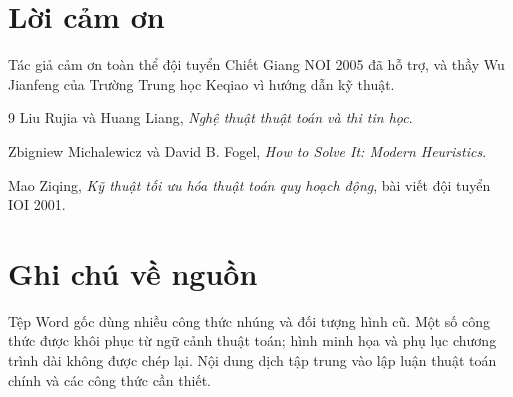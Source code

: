 \documentclass[11pt]{article}
\begin{document}
\section*{Lời cảm ơn}

Tác giả cảm ơn toàn thể đội tuyển Chiết Giang NOI 2005 đã hỗ trợ, và thầy Wu
Jianfeng của Trường Trung học Keqiao vì hướng dẫn kỹ thuật.

\begin{thebibliography}{9}
Liu Rujia và Huang Liang, \textit{Nghệ thuật thuật toán và thi tin học}.

Zbigniew Michalewicz và David B. Fogel, \textit{How to Solve It: Modern
Heuristics}.

Mao Ziqing, \textit{Kỹ thuật tối ưu hóa thuật toán quy hoạch động}, bài viết
đội tuyển IOI 2001.
\end{thebibliography}

\section*{Ghi chú về nguồn}

Tệp Word gốc dùng nhiều công thức nhúng và đối tượng hình cũ. Một số công thức
được khôi phục từ ngữ cảnh thuật toán; hình minh họa và phụ lục chương trình
dài không được chép lại. Nội dung dịch tập trung vào lập luận thuật toán chính
và các công thức cần thiết.
\end{document}
